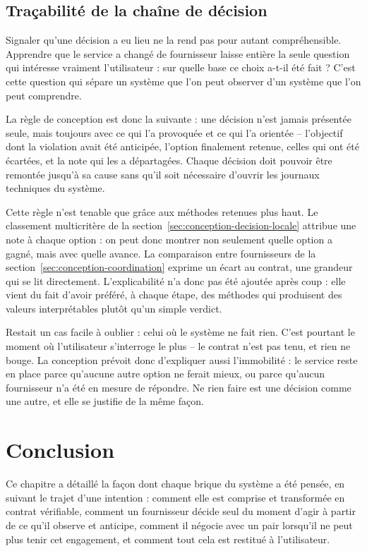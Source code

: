 \subsection{Traçabilité de la chaîne de décision}

Signaler qu'une décision a eu lieu ne la rend pas pour autant compréhensible. Apprendre que le service a changé de fournisseur laisse entière la seule question qui intéresse vraiment l'utilisateur : sur quelle base ce choix a-t-il été fait ? C'est cette question qui sépare un système que l'on peut observer d'un système que l'on peut comprendre.

La règle de conception est donc la suivante : une décision n'est jamais présentée seule, mais toujours avec ce qui l'a provoquée et ce qui l'a orientée -- l'objectif dont la violation avait été anticipée, l'option finalement retenue, celles qui ont été écartées, et la note qui les a départagées. Chaque décision doit pouvoir être remontée jusqu'à sa cause sans qu'il soit nécessaire d'ouvrir les journaux techniques du système.

Cette règle n'est tenable que grâce aux méthodes retenues plus haut. Le classement multicritère de la section~\ref{sec:conception-decision-locale} attribue une note à chaque option : on peut donc montrer non seulement quelle option a gagné, mais avec quelle avance. La comparaison entre fournisseurs de la section~\ref{sec:conception-coordination} exprime un écart au contrat, une grandeur qui se lit directement. L'explicabilité n'a donc pas été ajoutée après coup : elle vient du fait d'avoir préféré, à chaque étape, des méthodes qui produisent des valeurs interprétables plutôt qu'un simple verdict.

Restait un cas facile à oublier : celui où le système ne fait rien. C'est pourtant le moment où l'utilisateur s'interroge le plus -- le contrat n'est pas tenu, et rien ne bouge. La conception prévoit donc d'expliquer aussi l'immobilité : le service reste en place parce qu'aucune autre option ne ferait mieux, ou parce qu'aucun fournisseur n'a été en mesure de répondre. Ne rien faire est une décision comme une autre, et elle se justifie de la même façon.

\section{Conclusion}

Ce chapitre a détaillé la façon dont chaque brique du système a été pensée, en suivant le trajet d'une intention : comment elle est comprise et transformée en contrat vérifiable, comment un fournisseur décide seul du moment d'agir à partir de ce qu'il observe et anticipe, comment il négocie avec un pair lorsqu'il ne peut plus tenir cet engagement, et comment tout cela est restitué à l'utilisateur.

